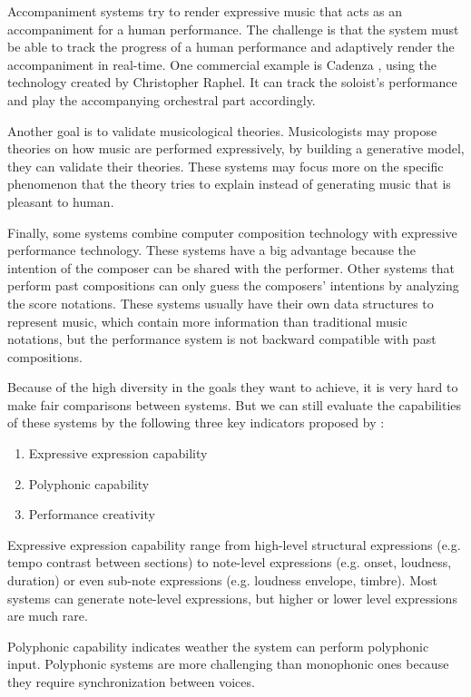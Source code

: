 Accompaniment systems try to render expressive music that acts as an accompaniment for a human performance. The challenge is that the system must be able to track the progress of a human performance and adaptively render the accompaniment in real-time. One commercial example is Cadenza \cite{cadenza}, using the technology created by Christopher Raphel. It can track the soloist's performance and play the accompanying orchestral part accordingly.


Another goal is to validate musicological theories. Musicologists may propose theories on how music are performed expressively, by building a generative model, they can validate their theories. These systems may focus more on the specific phenomenon that the theory tries to explain instead of generating music that is pleasant to human. 


Finally, some systems combine computer composition technology with expressive performance technology. These systems have a big advantage because the intention of the composer can be shared with the performer. Other systems that perform past compositions can only guess the composers' intentions by analyzing the score notations. These systems usually have their own data structures to represent music, which contain more information than traditional music notations, but the performance system is not backward compatible with past compositions.


Because of the high diversity in the goals they want to achieve, it is very hard to make fair comparisons between systems. But we can still evaluate the capabilities of these systems by the following three key indicators proposed by \cite{THEBOOK}:
\begin{enumerate}
   \item Expressive expression capability
   \item Polyphonic capability
   \item Performance creativity
\end{enumerate}

Expressive expression capability range from high-level structural expressions (e.g. tempo contrast between sections) to note-level expressions (e.g. onset, loudness, duration) or even sub-note expressions (e.g. loudness envelope, timbre). Most systems can generate note-level expressions, but higher or lower level expressions are much rare.

Polyphonic capability indicates weather the system can perform polyphonic input. Polyphonic systems are more challenging than monophonic ones because they require synchronization between voices. 

